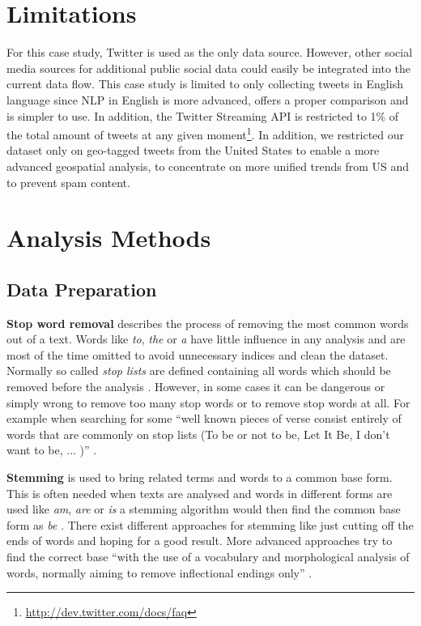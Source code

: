 \section{Limitations}
\label{sec:setup}
For this case study, Twitter is used as the only data source. However, other social media sources for additional public social data could easily be integrated into the current data flow. This case study is limited to only collecting tweets in English language since NLP in English is more advanced, offers a proper comparison and is simpler to use. In addition, the Twitter Streaming API is restricted to 1\% of the total amount of tweets at any given moment\footnote{\url{http://dev.twitter.com/docs/faq} \accessednote}. In addition, we restricted our dataset only on geo-tagged tweets from the United States to enable a more advanced geospatial analysis, to concentrate on more unified trends from US and to prevent spam content.

\section{Analysis Methods}
\label{sec:analysis-methods}

\subsection{Data Preparation}
\label{subsec:data-preparation}

\textbf{Stop word removal} describes the process of removing the most common words out of a text. Words like \textit{to}, \textit{the} or \textit{a} have little influence in any analysis and are most of the time omitted to avoid unnecessary indices and clean the dataset. Normally so called \textit{stop lists} are defined containing all words which should be removed before the analysis \cite[27]{manning2008introduction}. However, in some cases it can be dangerous or simply wrong to remove too many stop words or to remove stop words at all. For example when searching for some \enquote{well known pieces of verse consist entirely of words that are commonly on stop lists (To be or not to be, Let It Be, I don’t want to be, ... )} \cite[27]{manning2008introduction}.

\textbf{Stemming} is used to bring related terms and words to a common base form. This is often needed when texts are analysed and words in different forms are used like \textit{am}, \textit{are} or \textit{is} a stemming algorithm would then find the common base form as \textit{be} \cite[32]{manning2008introduction}. There exist different approaches for stemming like just cutting off the ends of words and hoping for a good result. More advanced approaches try to find the correct base \enquote{with the use of a vocabulary and morphological analysis of words, normally aiming to remove inflectional endings only} \cite[32]{manning2008introduction}.

